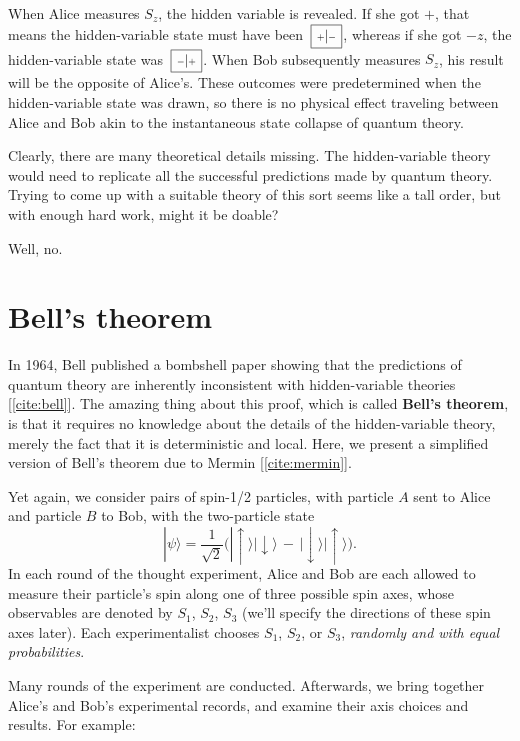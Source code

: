 \documentclass[pra,12pt]{revtex4-2}
\def\hvbox[#1]#2{\,\boxed{\scalebox{0.7}{$\,#1$}|\scalebox{0.7}{$#2\,$}}}
\begin{document}
When Alice measures $S_z$, the hidden variable is revealed.  If she
got $+$, that means the hidden-variable state must have been
$\hvbox[+]{-}$, whereas if she got $-z$, the hidden-variable state was
$\hvbox[-]{+}$.  When Bob subsequently measures $S_z$, his result will
be the opposite of Alice's.  These outcomes were predetermined when
the hidden-variable state was drawn, so there is no physical effect
traveling between Alice and Bob akin to the instantaneous state
collapse of quantum theory.

Clearly, there are many theoretical details missing.  The
hidden-variable theory would need to replicate all the successful
predictions made by quantum theory.  Trying to come up with a suitable
theory of this sort seems like a tall order, but with enough hard
work, might it be doable?

Well, no.

\section{Bell's theorem}
\label{sec:bell}

In 1964, Bell published a bombshell paper showing that the predictions
of quantum theory are inherently inconsistent with hidden-variable
theories [\ref{cite:bell}].  The amazing thing about this proof, which
is called \textbf{Bell's theorem}, is that it requires no knowledge
about the details of the hidden-variable theory, merely the fact that
it is deterministic and local.  Here, we present a simplified version
of Bell's theorem due to Mermin [\ref{cite:mermin}].

Yet again, we consider pairs of spin-1/2 particles, with particle $A$
sent to Alice and particle $B$ to Bob, with the two-particle state
\begin{equation}
  |\psi\rangle = \frac{1}{\sqrt{2}} \Big(|\!\uparrow\rangle|\!\downarrow\rangle \,-\, |\!\downarrow\rangle|\!\uparrow\rangle\Big).
  \label{bellsinglet}
\end{equation}
In each round of the thought experiment, Alice and Bob are each
allowed to measure their particle's spin along one of three possible
spin axes, whose observables are denoted by $S_1$, $S_2$, $S_3$ (we'll
specify the directions of these spin axes later).  Each
experimentalist chooses $S_1$, $S_2$, or $S_3$, \textit{randomly and
  with equal probabilities}.

Many rounds of the experiment are conducted.  Afterwards, we bring
together Alice's and Bob's experimental records, and examine their
axis choices and results.  For example:
\end{document}
